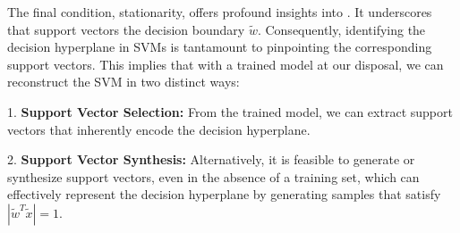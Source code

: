 The final condition, stationarity, offers profound insights into . It underscores that support vectors  the decision boundary $\tilde{w}$. Consequently, identifying the decision hyperplane in SVMs is tantamount to pinpointing the corresponding support vectors. This implies that with a trained model at our disposal, we can reconstruct the SVM in two distinct ways:

1. \textbf{Support Vector Selection:} From the trained model, we can extract support vectors  that inherently encode the decision hyperplane.

2. \textbf{Support Vector Synthesis:} Alternatively, it is feasible to generate or synthesize support vectors, even in the absence of a training set, which can effectively represent the decision hyperplane by generating samples that satisfy $|\tilde{w}^T\tilde{x}| = 1$.

